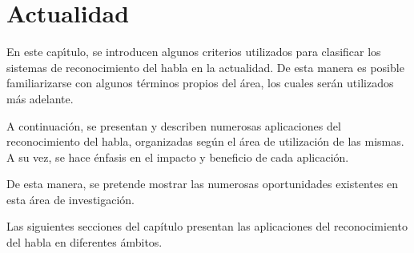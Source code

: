 \chapter{Actualidad}
\label{sec:areas-aplicacion}
En este cap{\'\i}tulo, se introducen algunos criterios utilizados para clasificar los sistemas
de reconocimiento del habla en la actualidad. De esta manera es posible familiarizarse con
algunos t\'erminos propios del \'area, los cuales ser\'an utilizados m\'as adelante.

A continuaci\'on, se presentan y describen numerosas aplicaciones del reconocimiento del habla, 
organizadas seg\'un el \'area de utilizaci\'on de las mismas. A su vez, se hace \'enfasis en el impacto 
y beneficio de cada aplicaci\'on.

De esta manera, se pretende mostrar las numerosas oportunidades existentes en esta \'area de investigaci\'on.



Las siguientes secciones del cap\'itulo presentan las aplicaciones del reconocimiento del habla en diferentes
\'ambitos.









